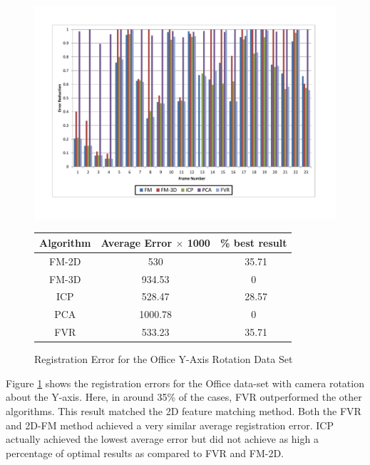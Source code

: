 \begin{figure}
\centering
\includegraphics[width=6in]{images/results/Office_Texture_Rotation}
\caption{Registration Error for the Office Y-Axis Rotation Data Set}
\label{fig:PET11}

\begin{tabular}{ccc}
\hline
\textbf{Algorithm} & \textbf{Average Error $\times$ 1000} & \textbf{\% best result}\\ \hline
FM-2D	& 530 & ~35.71\\
FM-3D	& 934.53 & 0\\
ICP		& 528.47 & ~28.57\\
PCA		& 1000.78 & 0\\
FVR		& 533.23 & ~35.71\\
\end{tabular}
\end{figure} 


Figure \ref{fig:PET11} shows the registration errors for the Office data-set with camera rotation about the Y-axis. Here, in around 35\% of the cases, FVR outperformed the other algorithms. This result matched the 2D feature matching method. Both the FVR and 2D-FM method achieved a very similar average registration error. ICP actually achieved the lowest average error but did not achieve as high a percentage of optimal results as compared to FVR and FM-2D. \\

